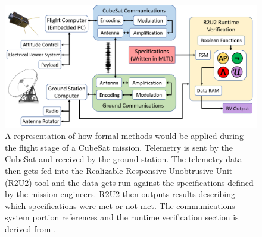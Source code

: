 \documentclass[conf]{new-aiaa}
\begin{document}

\begin{figure}[!ht]
\includegraphics[width=1.0\textwidth]{Fig/InFlight.png}
\caption{A representation of how formal methods would be applied during the flight stage of a CubeSat mission. Telemetry is sent by the CubeSat and received by the ground station. The telemetry data then gets fed into the Realizable Responsive Unobtrusive Unit (R2U2) tool and the data gets run against the specifications defined by the mission engineers. R2U2 then outputs results describing which specifications were met or not met. The communications system portion references \cite{Asundi2013} and the runtime verification section is derived from \cite{ARS17}.}
\label{Overview}
\end{figure}
\end{document}
